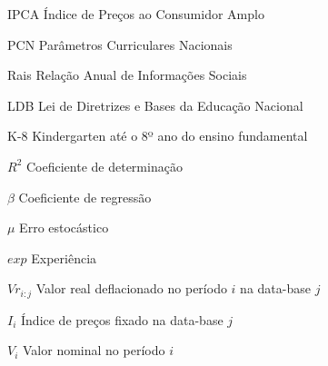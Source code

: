 \listoffigures*
\cleardoublepage


\listoftables*
\cleardoublepage

\begin{siglas}
  \item[IPCA] Índice de Preços ao Consumidor Amplo
  \item[PCN] Parâmetros Curriculares Nacionais
  \item[Rais] Relação Anual de Informações Sociais
  \item[LDB] Lei de Diretrizes e Bases da Educação Nacional
  \item[K-8] Kindergarten até o 8º ano do ensino fundamental
\end{siglas}

\begin{simbolos}
  \item[$R^2$] Coeficiente de determinação
  \item[$\beta$] Coeficiente de regressão
  \item[$\mu$] Erro estocástico
  \item[$exp$] Experiência
  \item[$Vr_{i:j}$] Valor real deflacionado no período $i$ na data-base $j$
  \item[$I_i$] Índice de preços fixado na data-base $j$
  \item[$V_i$] Valor nominal no período $i$
\end{simbolos}

\tableofcontents*
\cleardoublepage

\textual
\pagestyle{simple}